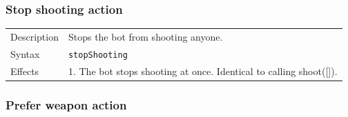 \documentclass[11pt,a4paper]{article}
\begin{document}
\subsubsection*{Stop shooting action}
\begin{small}
\begin{tabular}{p{2cm}p{9cm}}
Description & Stops the bot from shooting anyone.\\
Syntax & \verb|stopShooting| \\

Effects & 
	1.	The bot stops shooting at once. Identical to calling shoot([]).\\
\end{tabular}
\end{small}


\subsubsection*{Prefer weapon action}
\end{document}

